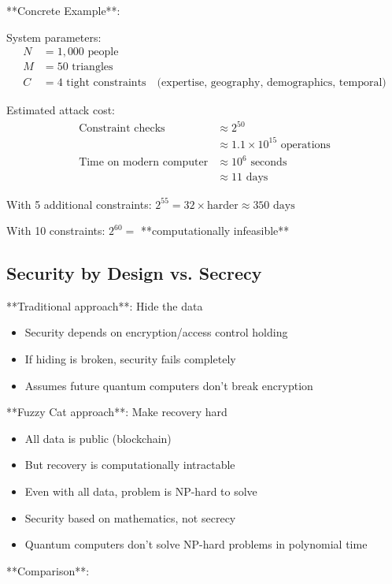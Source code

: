 \documentclass[12pt,a4paper]{article}
\theoremstyle{definition}
\begin{document}
{**Concrete Example**:

System parameters:
\begin{align}
N &= 1,000 \text{ people} \\
M &= 50 \text{ triangles} \\
C &= 4 \text{ tight constraints} \quad \text{(expertise, geography, demographics, temporal)}
\end{align}

Estimated attack cost:
\begin{align}
\text{Constraint checks} &\approx 2^{50} \\
&\approx 1.1 \times 10^{15} \text{ operations} \\
\text{Time on modern computer} &\approx 10^6 \text{ seconds} \\
&\approx 11 \text{ days}
\end{align}

With 5 additional constraints: $2^{55} = 32 \times \text{harder} \approx 350 \text{ days}$

With 10 constraints: $2^{60} = $ **computationally infeasible**

\subsection{Security by Design vs. Secrecy}

**Traditional approach**: Hide the data
\begin{itemize}
    \item Security depends on encryption/access control holding
    \item If hiding is broken, security fails completely
    \item Assumes future quantum computers don't break encryption
\end{itemize}

**Fuzzy Cat approach**: Make recovery hard
\begin{itemize}
    \item All data is public (blockchain)
    \item But recovery is computationally intractable
    \item Even with all data, problem is NP-hard to solve
    \item Security based on mathematics, not secrecy
    \item Quantum computers don't solve NP-hard problems in polynomial time
\end{itemize}

**Comparison**:

}
\end{document}
